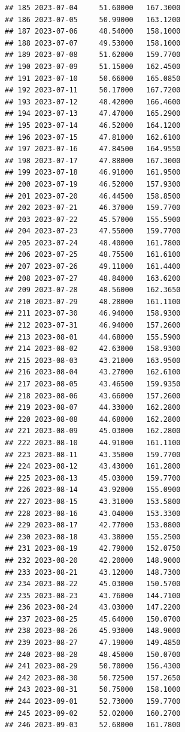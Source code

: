 \documentclass[
]{article}
\begin{document}
\begin{verbatim}
## 185 2023-07-04     51.60000   167.3000
## 186 2023-07-05     50.99000   163.1200
## 187 2023-07-06     48.54000   158.1000
## 188 2023-07-07     49.53000   158.1000
## 189 2023-07-08     51.62000   159.7700
## 190 2023-07-09     51.15000   162.4500
## 191 2023-07-10     50.66000   165.0850
## 192 2023-07-11     50.17000   167.7200
## 193 2023-07-12     48.42000   166.4600
## 194 2023-07-13     47.47000   165.2900
## 195 2023-07-14     46.52000   164.1200
## 196 2023-07-15     47.81000   162.6100
## 197 2023-07-16     47.84500   164.9550
## 198 2023-07-17     47.88000   167.3000
## 199 2023-07-18     46.91000   161.9500
## 200 2023-07-19     46.52000   157.9300
## 201 2023-07-20     46.44500   158.8500
## 202 2023-07-21     46.37000   159.7700
## 203 2023-07-22     45.57000   155.5900
## 204 2023-07-23     47.55000   159.7700
## 205 2023-07-24     48.40000   161.7800
## 206 2023-07-25     48.75500   161.6100
## 207 2023-07-26     49.11000   161.4400
## 208 2023-07-27     48.84000   163.6200
## 209 2023-07-28     48.56000   162.3650
## 210 2023-07-29     48.28000   161.1100
## 211 2023-07-30     46.94000   158.9300
## 212 2023-07-31     46.94000   157.2600
## 213 2023-08-01     44.68000   155.5900
## 214 2023-08-02     42.63000   158.9300
## 215 2023-08-03     43.21000   163.9500
## 216 2023-08-04     43.27000   162.6100
## 217 2023-08-05     43.46500   159.9350
## 218 2023-08-06     43.66000   157.2600
## 219 2023-08-07     44.33000   162.2800
## 220 2023-08-08     44.68000   162.2800
## 221 2023-08-09     45.03000   162.2800
## 222 2023-08-10     44.91000   161.1100
## 223 2023-08-11     43.35000   159.7700
## 224 2023-08-12     43.43000   161.2800
## 225 2023-08-13     45.03000   159.7700
## 226 2023-08-14     43.92000   155.0900
## 227 2023-08-15     43.31000   153.5800
## 228 2023-08-16     43.04000   153.3300
## 229 2023-08-17     42.77000   153.0800
## 230 2023-08-18     43.38000   155.2500
## 231 2023-08-19     42.79000   152.0750
## 232 2023-08-20     42.20000   148.9000
## 233 2023-08-21     43.12000   148.7300
## 234 2023-08-22     45.03000   150.5700
## 235 2023-08-23     43.76000   144.7100
## 236 2023-08-24     43.03000   147.2200
## 237 2023-08-25     45.64000   150.0700
## 238 2023-08-26     45.93000   148.9000
## 239 2023-08-27     47.19000   149.4850
## 240 2023-08-28     48.45000   150.0700
## 241 2023-08-29     50.70000   156.4300
## 242 2023-08-30     50.72500   157.2650
## 243 2023-08-31     50.75000   158.1000
## 244 2023-09-01     52.73000   159.7700
## 245 2023-09-02     52.02000   160.2700
## 246 2023-09-03     52.68000   161.7800

\end{verbatim}
\end{document}
